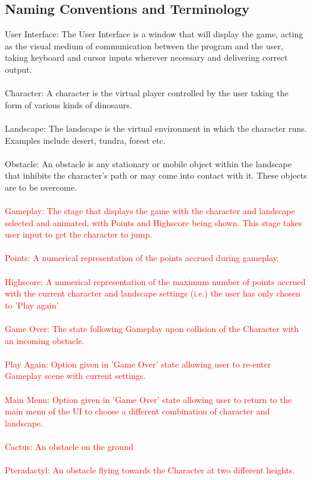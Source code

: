 \documentclass[12pt, titlepage]{article}
\begin{document}
\subsection{Naming Conventions and Terminology}
User Interface: The User Interface is a window that will display the game, acting as the visual medium of communication between the program and the user, taking keyboard and cursor inputs wherever necessary and delivering correct output. \\ \\
Character: A character is the virtual player controlled by the user taking the form of various kinds of dinosaurs.\\ \\
Landscape: The landscape is the virtual environment in which the character runs. Examples include desert, tundra, forest etc.\\ \\
Obstacle: An obstacle is any stationary or mobile object within the landscape that inhibits the character’s path or may come into contact with it. These objects are to be overcome. \\ \\
\textcolor{red}{Gameplay: The stage that displays the game with the character and landscape selected and animated, with Points and Highscore being shown. This stage takes user input to get the character to jump.} \\ \\
\textcolor{red}{Points: A numerical representation of the points accrued during gameplay.} \\ \\
\textcolor{red}{Highscore: A numerical representation of the maximum number of points accrued with the current character and landscape settings (i.e.) the user has only chosen to 'Play again'} \\ \\
\textcolor{red}{Game Over: The state following Gameplay upon collision of the Character with an incoming obstacle.} \\ \\
\textcolor{red}{Play Again: Option given in 'Game Over' state allowing user to re-enter Gameplay scene with current settings.} \\ \\
\textcolor{red}{Main Menu: Option given in 'Game Over' state allowing user to return to the main menu of the UI to choose a different combination of character and landscape.} \\ \\
\textcolor{red}{Cactus: An obstacle on the ground} \\ \\
\textcolor{red}{Pteradactyl: An obstacle flying towards the Character at two different heights.} \\ \\
\end{document}
